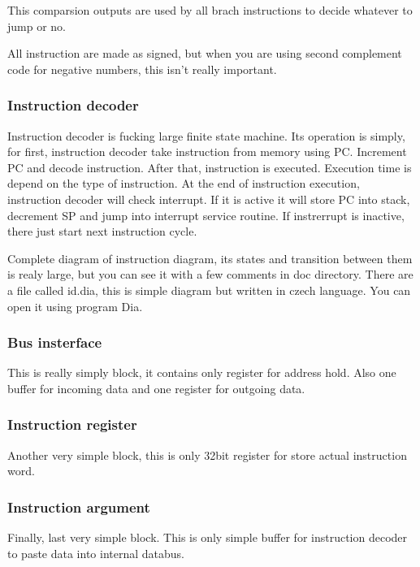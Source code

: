 This comparsion outputs are used by all brach instructions to decide whatever to
jump or no.

All instruction are made as signed, but when you are using second complement code 
for negative numbers, this isn't really important.

\subsubsection{Instruction decoder}

Instruction decoder is fucking large finite state machine. Its operation is
simply, for first, instruction decoder take instruction from memory using PC.
Increment PC and decode instruction. After that, instruction is executed.
Execution time is depend on the type of instruction. At the end of instruction
execution, instruction decoder will check interrupt. If it is active it will store
PC into stack, decrement SP and jump into interrupt service routine. If 
instrerrupt is inactive, there just start next instruction cycle. 

Complete diagram of instruction diagram, its states and transition between them 
is realy large, but you can see it with a few comments in doc directory. There are
a file called id.dia, this is simple diagram but written in czech language. 
You can open it using program Dia. 

\subsubsection{Bus insterface}

This is really simply block, it contains only register for address hold. Also
one buffer for incoming data and one register for outgoing data. 

\subsubsection{Instruction register}

Another very simple block, this is only 32bit register for store actual
instruction word.

\subsubsection{Instruction argument}

Finally, last very simple block. This is only simple buffer for instruction decoder
to paste data into internal databus.


